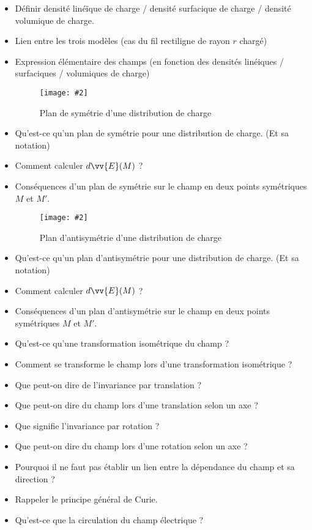 \documentclass[a4paper, 11pt, hidelinks]{article}
\newcommand{\img}[4]{\begin{figure}[!ht]
    \centering
    \texttt{[image: \#2]}
    \caption{#3}
    \label{#4}
    \end{figure} }
\begin{document}
\begin{itemize}
    \item Définir densité linéïque de charge / densité surfacique de charge / densité volumique de charge. \cite{Chapitre9}
    \item Lien entre les trois modèles (cas du fil rectiligne de rayon $r$ chargé) \cite{Chapitre9}
    \item Expression élémentaire des champs (en fonction des densités linéiques / surfaciques / volumiques de charge) \cite{Chapitre9}
    \newpage
    \img{0.5}{Images/Plan de symetrie d'une distribution de charge.PNG}{Plan de symétrie d'une distribution de charge}{Figure 6}
    \item Qu'est-ce qu'un plan de symétrie pour une distribution de charge. (Et sa notation) \cite{Chapitre9}
    \item Comment calculer $d\vv{E}(M)$ ? \cite{Chapitre9}
    \item Conséquences d'un plan de symétrie sur le champ en deux points symétriques $M$ et $M'$. \cite{Chapitre9}
    \img{0.5}{Images/Plan d'antisymetrie d'une distribution de charge.PNG}{Plan d'antisymétrie d'une distribution de charge}{Figure 7}
    \item Qu'est-ce qu'un plan d'antisymétrie pour une distribution de charge. (Et sa notation) \cite{Chapitre9}
    \item Comment calculer $d\vv{E}(M)$ ? \cite{Chapitre9}
    \item Conséquences d'un plan d'antisymétrie sur le champ en deux points symétriques $M$ et $M'$. \cite{Chapitre9}
    \item Qu'est-ce qu'une transformation isométrique du champ ? \cite{Chapitre9}
    \item Comment se transforme le champ lors d'une transformation isométrique ? \cite{Chapitre9}
    \item Que peut-on dire de l'invariance par translation ? \cite{Chapitre9}
    \item Que peut-on dire du champ lors d'une translation selon un axe ? \cite{Chapitre9}
    \item Que signifie l'invariance par rotation ? \cite{Chapitre9}
    \item Que peut-on dire du champ lors d'une rotation selon un axe ? \cite{Chapitre9}
    \item Pourquoi il ne faut pas établir un lien entre la dépendance du champ et sa direction ? \cite{Chapitre9}
    \item Rappeler le principe général de Curie. \cite{Chapitre9}
    \item Qu'est-ce que la circulation du champ électrique ? \cite{Chapitre9}

\end{itemize}
\end{document}
